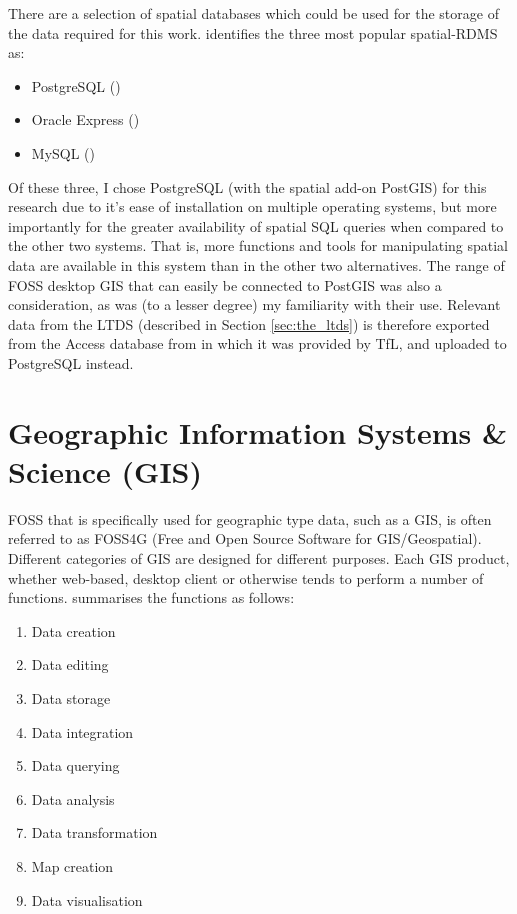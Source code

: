 There are a selection of spatial databases which could be used for the storage of the data required for this work. \cite{Ellul2012} identifies the three most popular spatial-RDMS as:

\begin{itemize}
\item PostgreSQL (\cite{PostgreSQL2014})
\item Oracle Express (\cite{Oracle2014})
\item MySQL (\cite{MySQL2014})
\end{itemize}

Of these three, I chose PostgreSQL (with the spatial add-on PostGIS) for this research due to it's ease of installation on multiple operating systems, but more importantly for the greater availability of spatial SQL queries when compared to the other two systems. That is, more functions and tools for manipulating spatial data are available in this system than in the other two alternatives. The range of FOSS desktop GIS that can easily be connected to PostGIS was also a consideration, as was (to a lesser degree) my familiarity with their use. Relevant data from the LTDS (described in Section \ref{sec:the_ltds}) is therefore exported from the Access database from in which it was provided by TfL, and uploaded to PostgreSQL instead.


\section{Geographic Information Systems \& Science (GIS)}
\label{sec:gis}

FOSS that is specifically used for geographic type data, such as a GIS, is often referred to as FOSS4G (Free and Open Source Software for GIS/Geospatial). Different categories of GIS are designed for different purposes. Each GIS product, whether web-based, desktop client or otherwise tends to perform a number of functions. \cite{Steiniger2013} summarises the functions as follows:

\begin{enumerate}
\item Data creation
\item Data editing
\item Data storage
\item Data integration
\item Data querying
\item Data analysis
\item Data transformation
\item Map creation
\item Data visualisation 
\end{enumerate}

